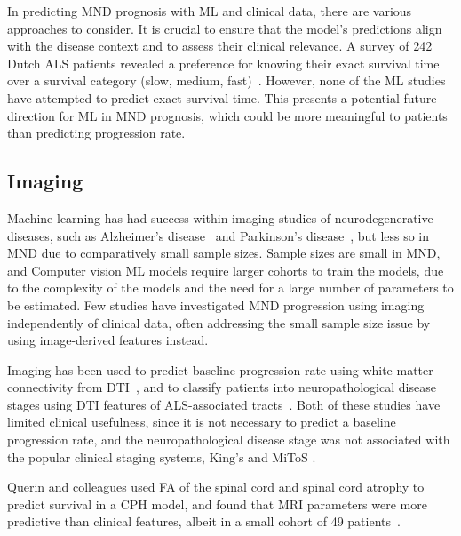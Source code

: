 In predicting MND prognosis with ML and clinical data, there are various approaches to consider.
It is crucial to ensure that the model's predictions align with the disease context and to assess their clinical relevance.
A survey of 242 Dutch ALS patients revealed a preference for knowing their exact survival time over a survival category (slow, medium, fast)~\cite{westenengPrognosisPatientsAmyotrophic2018}.
However, none of the ML studies have attempted to predict exact survival time.
This presents a potential future direction for ML in MND prognosis, which could be more meaningful to patients than predicting progression rate.

\subsection{Imaging}

Machine learning has had success within imaging studies of neurodegenerative diseases, such as Alzheimer's disease~\cite{petersenAlzheimerDiseaseNeuroimaging2010} and Parkinson's disease~\cite{marekParkinsonProgressionMarkers2018}, but less so in MND due to comparatively small sample sizes.
Sample sizes are small in MND, and
Computer vision ML models require larger cohorts to train the models, due to the complexity of the models and the need for a large number of parameters to be estimated.
Few studies have investigated MND progression using imaging independently of clinical data, often addressing the small sample size issue by using image-derived features instead.

Imaging has been used to predict baseline progression rate using white matter connectivity from DTI~\cite{liDisruptionWhiteMatter2021}, and to classify patients into neuropathological disease stages using DTI features of ALS-associated tracts~\cite{behlerMultivariateBayesianClassification2022}.
Both of these studies have limited clinical usefulness, since it is not necessary to predict a baseline progression rate, and the neuropathological disease stage was not associated with the popular clinical staging systems, King's and MiToS .

Querin and colleagues used FA of the spinal cord and spinal cord atrophy to predict survival in a CPH model, and found that MRI parameters were more predictive than clinical features, albeit in a small cohort of 49 patients~\cite{querinSpinalCordMultiparametric2017}.

